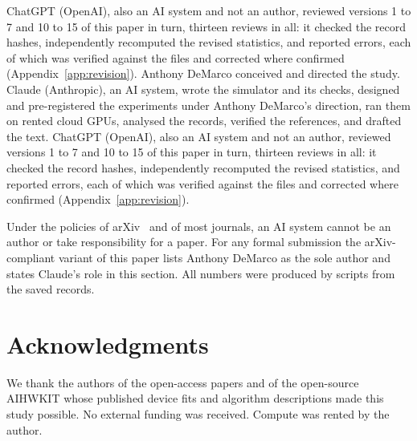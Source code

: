 ChatGPT (OpenAI), also an AI system and not an author, reviewed versions 1 to 7 and 10 to 15 of this paper in turn, thirteen reviews in all: it checked the
record hashes, independently recomputed the revised statistics, and reported errors, each of which was verified against
the files and corrected where confirmed (Appendix~\ref{app:revision}).
\else
Anthony DeMarco conceived and directed the study. Claude (Anthropic), an AI system, wrote the simulator and its checks, designed and
pre-registered the experiments under Anthony DeMarco's direction, ran them on rented cloud GPUs, analysed the records, verified the
references, and drafted the text. ChatGPT (OpenAI), also an AI system and not an author, reviewed versions 1 to 7 and 10 to 15 of this paper in turn, thirteen reviews in all: it checked the
record hashes, independently recomputed the revised statistics, and reported errors, each of which was verified against
the files and corrected where confirmed (Appendix~\ref{app:revision}).

Under the policies of arXiv~\cite{arxiv_policy} and of most journals, an AI system cannot be an author or take responsibility
for a paper. For any formal submission the arXiv-compliant variant of this paper lists Anthony DeMarco as the sole author and states
Claude's role in this section. All numbers were produced by scripts from the saved records.
\fi

\section*{Acknowledgments}
We thank the authors of the open-access papers and of the open-source AIHWKIT whose published device fits and algorithm
descriptions made this study possible. No external funding was received. Compute was rented by the author.




\appendix






